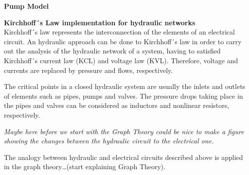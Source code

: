  \textbf{Pump Model} \\
 \label{PumpModel}
 
 \textbf{Kirchhoff´s Law implementation for hydraulic networks}\\
 \label{KirchhoffLaw}
 Kirchhoff´s law represents the interconnection of the elements of an electrical circuit. An hydraulic approach 
 can be done to Kirchhoff´s law in order to carry out the analysis of the hydraulic network of a system, having to satisfied Kirchhoff´s 
 current law (KCL) and voltage law (KVL). Therefore, voltage and currents are replaced by pressure and flows, respectively. 

The critical points in a closed hydraulic system are usually the inlets and outlets of elements such as pipes, pumps and valves. 
The pressure drops taking place in the pipes and valves can be considered as inductors and nonlinear resistors, respectively. 

\textit{Maybe here before we start with the Graph Theory could be nice to make a figure showing the changes between the hydraulic circuit to the electrical 
one.}

The analogy between hydraulic and electrical circuits described above is applied in the graph theory…(start explaining Graph Theory).






